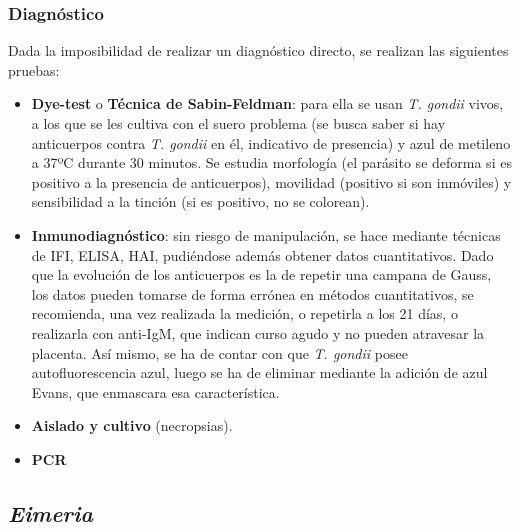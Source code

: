 \subsubsection{Diagnóstico}
Dada la imposibilidad de realizar un diagnóstico directo, se realizan las siguientes pruebas:
\begin{itemize}[itemsep=0pt,parsep=0pt,topsep=0pt,partopsep=0pt]
	\item \textbf{Dye-test} o \textbf{Técnica de Sabin-Feldman}: para ella se usan \textit{T. gondii} vivos, a los que se les cultiva con el suero problema (se busca saber si hay anticuerpos contra \textit{T. gondii} en él, indicativo de presencia) y azul de metileno a 37ºC durante 30 minutos. Se estudia morfología (el parásito se deforma si es positivo a la presencia de anticuerpos), movilidad (positivo si son inmóviles) y sensibilidad a la tinción (si es positivo, no se colorean).
	\item \textbf{Inmunodiagnóstico}: sin riesgo de manipulación, se hace mediante técnicas de IFI, ELISA, HAI, pudiéndose además obtener datos cuantitativos. Dado que la evolución de los anticuerpos es la de repetir una campana de Gauss, los datos pueden tomarse de forma errónea en métodos cuantitativos, se recomienda, una vez realizada la medición, o repetirla a los 21 días, o realizarla con anti-IgM, que indican curso agudo y no pueden atravesar la placenta. Así mismo, se ha de contar con que \textit{T. gondii} posee autofluorescencia azul, luego se ha de eliminar mediante la adición de azul Evans, que enmascara esa característica.
	\item \textbf{Aislado y cultivo} (necropsias).
	\item\textbf{PCR}
\end{itemize}
\newpage
\subsection{\textit{Eimeria}}